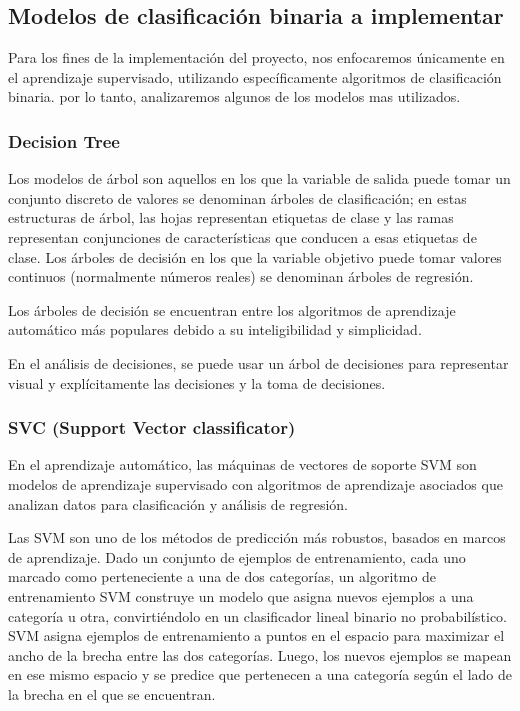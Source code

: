 \subsection{Modelos de clasificación binaria a implementar}
Para los fines de la implementación del proyecto, nos enfocaremos únicamente en el aprendizaje supervisado, utilizando específicamente algoritmos de clasificación binaria. por lo tanto, analizaremos algunos de los modelos mas utilizados. \par
\subsubsection{ Decision Tree} \par

Los modelos de árbol son aquellos en los que la variable de salida puede tomar un conjunto discreto de valores se denominan árboles de clasificación; en estas estructuras de árbol, las hojas representan etiquetas de clase y las ramas representan conjunciones de características que conducen a esas etiquetas de clase. Los árboles de decisión en los que la variable objetivo puede tomar valores continuos (normalmente números reales) se denominan árboles de regresión. \par

Los árboles de decisión se encuentran entre los algoritmos de aprendizaje automático más populares debido a su inteligibilidad y simplicidad.\par

En el análisis de decisiones, se puede usar un árbol de decisiones para representar visual y explícitamente las decisiones y la toma de decisiones.\par

\subsubsection{ SVC (Support Vector classificator)} \par
En el aprendizaje automático, las máquinas de vectores de soporte SVM son modelos de aprendizaje supervisado con algoritmos de aprendizaje asociados que analizan datos para clasificación y análisis de regresión. \par 
Las SVM son uno de los métodos de predicción más robustos, basados en marcos de aprendizaje. Dado un conjunto de ejemplos de entrenamiento, cada uno marcado como perteneciente a una de dos categorías, un algoritmo de entrenamiento SVM construye un modelo que asigna nuevos ejemplos a una categoría u otra, convirtiéndolo en un clasificador lineal binario no probabilístico. SVM asigna ejemplos de entrenamiento a puntos en el espacio para maximizar el ancho de la brecha entre las dos categorías. Luego, los nuevos ejemplos se mapean en ese mismo espacio y se predice que pertenecen a una categoría según el lado de la brecha en el que se encuentran.\par

